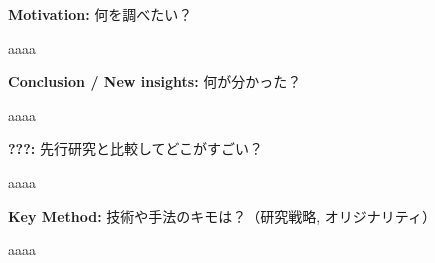\documentclass[a4j,11pt,twocolumn,dvipdfmx,platex]{jsarticle}
\begin{document}
%
%
%
%
%
%


\footnotesize
\begin{screen}
	{\bf Motivation:}
	何を調べたい？
\end{screen}
%
aaaa


\vspace{4mm}
\begin{screen}
	{\bf Conclusion / New insights:}
	何が分かった？
\end{screen}
%
aaaa


\vspace{4mm}
\begin{screen}
	{\bf ???:}
	先行研究と比較してどこがすごい？
\end{screen}
%
aaaa


\vspace{4mm}
\begin{screen}
	{\bf Key Method:}
	技術や手法のキモは？（研究戦略, オリジナリティ）
\end{screen}
%
aaaa
\end{document}
